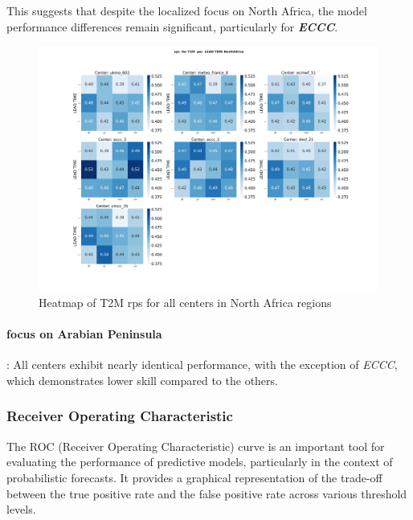 This suggests that despite the localized focus on North Africa, the model performance differences remain significant, particularly for \textbf{\textit{ECCC}}. 

\begin{figure}[H]
\includegraphics[scale=0.3]{plots/prob/rps/rps_T2M_NorthAfrica.png}

\caption{Heatmap of T2M  rps  for all centers in North Africa regions}
\end{figure}


\paragraph{focus on Arabian Peninsula}:
All centers exhibit nearly identical performance, with the exception of \textit{ECCC}, which demonstrates lower skill compared to the others.
\subsubsection{Receiver Operating Characteristic}

The ROC (Receiver Operating Characteristic) curve is an important tool for evaluating the performance of predictive models, particularly in the context of probabilistic forecasts. It provides a graphical representation of the trade-off between the true positive rate  and the false positive rate  across various threshold levels.

